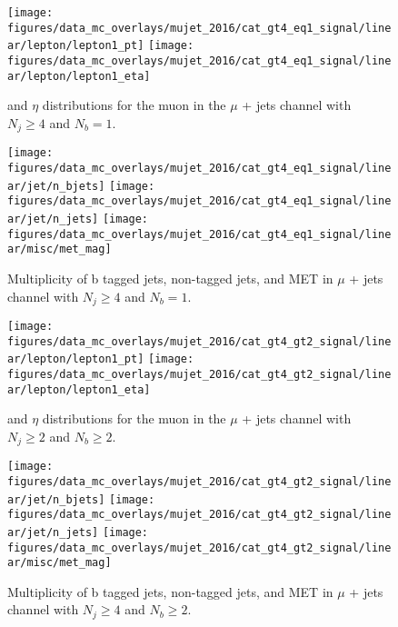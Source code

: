 \begin{figure}[htb!]
    \centering
    \texttt{[image: figures/data\_mc\_overlays/mujet\_2016/cat\_gt4\_eq1\_signal/linear/lepton/lepton1\_pt]}
    \texttt{[image: figures/data\_mc\_overlays/mujet\_2016/cat\_gt4\_eq1\_signal/linear/lepton/lepton1\_eta]}
    \caption{\pt and $\eta$ distributions for the muon in the $\mu$ + jets
    channel with $N_{j} \geq 4$ and $N_{b} = 1$.
    \label{fig:mujet_1_kinematic}}
\end{figure}

\begin{figure}[htb!]
    \centering
    \texttt{[image: figures/data\_mc\_overlays/mujet\_2016/cat\_gt4\_eq1\_signal/linear/jet/n\_bjets]}
    \texttt{[image: figures/data\_mc\_overlays/mujet\_2016/cat\_gt4\_eq1\_signal/linear/jet/n\_jets]}
    \texttt{[image: figures/data\_mc\_overlays/mujet\_2016/cat\_gt4\_eq1\_signal/linear/misc/met\_mag]}
    \caption{Multiplicity of b tagged jets, non-tagged jets, and MET in
    $\mu$ + jets channel with $N_{j} \geq 4$ and $N_{b} = 1$.
    \label{fig:mujet_1_jetmet}}
\end{figure}

\begin{figure}[htb!]
    \centering
    \texttt{[image: figures/data\_mc\_overlays/mujet\_2016/cat\_gt4\_gt2\_signal/linear/lepton/lepton1\_pt]}
    \texttt{[image: figures/data\_mc\_overlays/mujet\_2016/cat\_gt4\_gt2\_signal/linear/lepton/lepton1\_eta]}
    \caption{\pt and $\eta$ distributions for the muon in the $\mu$ + jets
    channel with $N_{j} \geq 2$ and $N_{b} \geq 2$.
    \label{fig:mujet_2_kinematic}}
\end{figure}

\begin{figure}[htb!]
    \centering
    \texttt{[image: figures/data\_mc\_overlays/mujet\_2016/cat\_gt4\_gt2\_signal/linear/jet/n\_bjets]}
    \texttt{[image: figures/data\_mc\_overlays/mujet\_2016/cat\_gt4\_gt2\_signal/linear/jet/n\_jets]}
    \texttt{[image: figures/data\_mc\_overlays/mujet\_2016/cat\_gt4\_gt2\_signal/linear/misc/met\_mag]}
    \caption{Multiplicity of b tagged jets, non-tagged jets, and MET in
    $\mu$ + jets channel with $N_{j} \geq 4$ and $N_{b} \geq 2$.
    \label{fig:mujet_2_jetmet}}
\end{figure}
